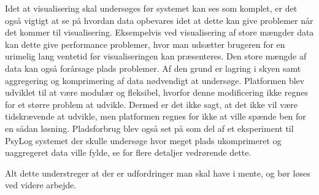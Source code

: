 Idet at visualisering skal undersøges før systemet kan ses som komplet, er det også vigtigt at se på hvordan data opbevares idet at dette kan give problemer når det kommer til visualisering. 
Eksempelvis ved visualisering af store mængder data kan dette give performance problemer, hvor man udsætter brugeren for en urimelig lang ventetid før visualiseringen kan præsenteres. 
Den store mængde af data kan også forårsage plads problemer. 
Af den grund er lagring i skyen samt aggregering og komprimering af data nødvendigt at undersøge.
Platformen blev udviklet til at være modulær og fleksibel, hvorfor denne modificering ikke regnes for et større problem at udvikle.
Dermed er det ikke sagt, at det ikke vil være tidskrævende at udvikle, men platformen regnes for ikke at ville spænde ben for en sådan løsning.
Pladsforbrug blev også set på som del af et eksperiment til PsyLog systemet der skulle undersøge hvor meget plads ukomprimeret og uaggregeret data ville fylde, se \citet[Kapitel 4, Sektion 6]{misc:faellesrapp} for flere detaljer vedrørende dette.

Alt dette understreger at der er udfordringer man skal have i mente, og bør løses ved videre arbejde.